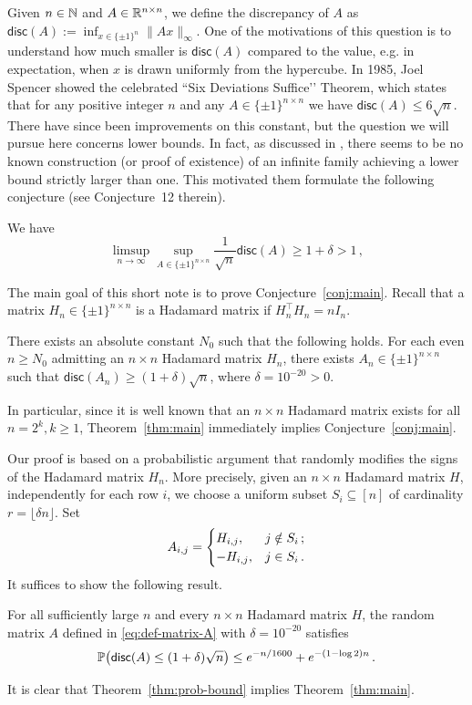 \documentclass[11pt,reqno]{amsart}
\def\disc{{\mathsf{disc}}}
\begin{document}
Given $n \in {\mathbb{N}}$ and $A \in {\mathbb{R}}^{n \times n}$, we define the discrepancy of $A$ as $\disc(A):=\inf_{x\in\{\pm1\}^n}\|Ax\|_{\infty}$.
One of the motivations of this question is to understand how much smaller is $\disc(A)$ compared to the value, e.g. in expectation, when $x$ is drawn uniformly from the hypercube. In 1985, Joel Spencer \cite{spencer1985six} showed the celebrated ``Six Deviations Suffice’’ Theorem, which states that for any positive integer $n$ and any $A \in \{ \pm 1 \}^{n \times n}$ we have $\disc(A) \le 6\sqrt n$. There have since been improvements on this constant, but the question we will pursue here concerns lower bounds. In fact, as discussed in \cite{bandeira2026randomstrasse101}, there seems to be no known construction (or proof of existence) of an infinite family achieving a lower bound strictly larger than one. This motivated them formulate the following conjecture (see Conjecture~12 therein).
\begin{conj}{\label{conj:main}}
    We have
    \[
        \limsup_{n \to \infty} \sup_{ A \in \{ \pm 1 \}^{n \times n} } \frac{1}{\sqrt n} \disc(A) \ge 1+\delta >1 \,,
    \]
\end{conj}
The main goal of this short note is to prove Conjecture~\ref{conj:main}. Recall that a matrix $H_n \in \{ \pm 1 \}^{n \times n}$ is a Hadamard matrix if $H_n^{\top} H_n =n I_n$.
\begin{thm}{\label{thm:main}}
    There exists an absolute constant $N_0$ such that the following holds. For each even $n \ge N_0$ admitting an $n\times n$ Hadamard matrix $H_n$, there exists $A_n \in \{ \pm 1 \}^{n \times n}$ such that $\disc(A_n) \ge (1+\delta)\sqrt n$, where $\delta=10^{-20}>0$.
\end{thm}
In particular, since it is well known that an $n \times n$ Hadamard matrix exists for all $n=2^{k}, k \ge 1$, Theorem~\ref{thm:main} immediately implies Conjecture~\ref{conj:main}.

Our proof is based on a probabilistic argument that randomly modifies the signs of the Hadamard matrix $H_n$. More precisely, given an $n \times n$ Hadamard matrix $H$, independently for each row $i$, we choose a uniform subset $S_i\subseteq[n]$ of cardinality $r=\lfloor\delta n\rfloor$. Set
\begin{equation}{\label{eq:def-matrix-A}}
    A_{i,j}=
    \begin{cases}
        H_{i,j}, & j \notin S_i \,; \\
        -H_{i,j}, & j \in S_i \,.
    \end{cases}
\end{equation}
It suffices to show the following result.
\begin{thm}{\label{thm:prob-bound}}
    For all sufficiently large $n$ and every $n\times n$ Hadamard matrix $H$, the random matrix $A$ defined in \eqref{eq:def-matrix-A} with $\delta=10^{-20}$ satisfies
    \[
        \bbP\bigl(\disc(A)\le(1+\delta)\sqrt n\bigr) \le e^{-n/1600}+e^{-(1-\log 2)n} \,.
    \]
\end{thm}
It is clear that Theorem~\ref{thm:prob-bound} implies Theorem~\ref{thm:main}.
\end{document}
